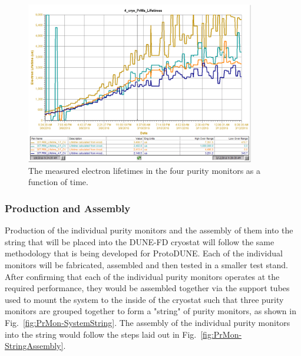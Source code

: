 \begin{figure}[t!]
\begin{center}
\includegraphics[width=10cm]{figures/PrMon_35t-PrM.pdf}
\caption{The measured electron lifetimes in the four purity monitors as a function of time.} \label{fig-35t-prm}
\end{center}
\end{figure}



\subsubsection{Production and Assembly}
\label{sec:PrMon-Production-Assembly}
Production of the individual purity monitors and the assembly of them into the string that will be placed into the DUNE-FD cryostat will follow the same methodology that is being developed for ProtoDUNE.  Each of the individual monitors will be fabricated, assembled and then tested in a smaller test stand.  After confirming that each of the individual purity monitors operates at the required performance, they would be assembled together via the support tubes used to mount the system to the inside of the cryostat such that three purity monitors are grouped together to form a "string" of purity monitors, as shown in Fig.~\ref{fig:PrMon-SystemString}.  The assembly of the individual purity monitors into the string would follow the steps laid out in Fig.~\ref{fig:PrMon-StringAssembly}.  


